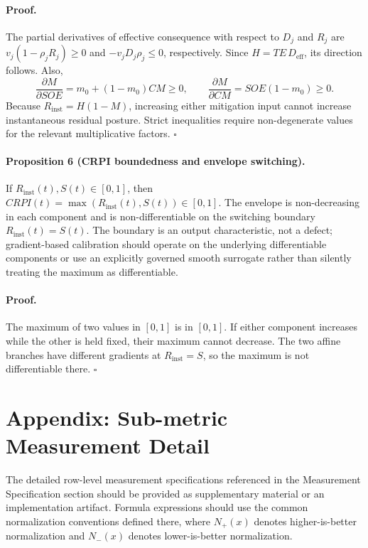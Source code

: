 \documentclass[11pt]{article}
\begin{document}
\paragraph{Proof.}
The partial derivatives of effective consequence with respect to $D_j$ and $R_j$ are
$v_j(1-\rho_jR_j)\geq0$ and $-v_jD_j\rho_j\leq0$, respectively. Since
$H=TE\,D_{\mathrm{eff}}$, its direction follows. Also,
\begin{equation}
  \frac{\partial M}{\partial SOE}=m_0+(1-m_0)CM\geq0,
  \qquad
  \frac{\partial M}{\partial CM}=SOE(1-m_0)\geq0.
\end{equation}
Because $R_{\mathrm{inst}}=H(1-M)$, increasing either mitigation input cannot
increase instantaneous residual posture. Strict inequalities require non-degenerate
values for the relevant multiplicative factors. $\square$

\paragraph{Proposition 6 (CRPI boundedness and envelope switching).}
If $R_{\mathrm{inst}}(t),S(t)\in[0,1]$, then
$CRPI(t)=\max(R_{\mathrm{inst}}(t),S(t))\in[0,1]$. The envelope is non-decreasing
in each component and is non-differentiable on the switching boundary
$R_{\mathrm{inst}}(t)=S(t)$. The boundary is an output characteristic, not a defect;
gradient-based calibration should operate on the underlying differentiable components
or use an explicitly governed smooth surrogate rather than silently treating the maximum
as differentiable.

\paragraph{Proof.}
The maximum of two values in $[0,1]$ is in $[0,1]$. If either component increases while
the other is held fixed, their maximum cannot decrease. The two affine branches have
different gradients at $R_{\mathrm{inst}}=S$, so the maximum is not differentiable there.
$\square$

\section{Appendix: Sub-metric Measurement Detail}
\label{app:submetric-detail}

The detailed row-level measurement specifications referenced in the Measurement Specification section should be
provided as supplementary material or an implementation artifact. Formula expressions
should use the common normalization conventions defined there, where $N_+(x)$
denotes higher-is-better normalization and $N_-(x)$ denotes lower-is-better
normalization.
\end{document}
